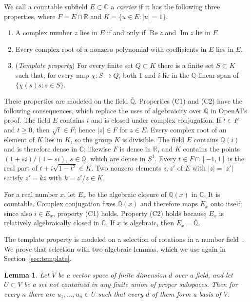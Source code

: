 \documentclass[10pt]{article}
\newtheorem{lem}[thm]{Lemma}
\theoremstyle{remark}
\newcommand{\C}{\mathbb C}
\newcommand{\R}{\mathbb R}
\newcommand{\Q}{\mathbb Q}
\newcommand{\Qbar}{\overline{\mathbb Q}}
\DeclareMathOperator{\re}{Re}
\DeclareMathOperator{\im}{Im}
\begin{document}
We call a countable subfield $E\subset\C$ a \emph{carrier} if it has the following three properties, where $F=E\cap\R$ and $K=\{u\in E:|u|=1\}$.
\begin{enumerate}
\item[(C1)] A complex number $z$ lies in $E$ if and only if $\re z$ and $\im z$ lie in $F$.
\item[(C2)] Every complex root of a nonzero polynomial with coefficients in $E$ lies in $E$.
\item[(C3)] (\emph{Template property}) For every finite set $Q\subset K$ there is a finite set $S\subset K$ such that, for every map $\chi\colon S\to Q$, both $1$ and $i$ lie in the $\Q$-linear span of $\{\chi(s)s:s\in S\}$.
\end{enumerate}

These properties are modeled on the field $\Qbar$. Properties (C1) and (C2) have the following consequences, which replace the uses of algebraicity over $\Q$ in OpenAI's proof. The field $E$ contains $i$ and is closed under complex conjugation. If $t\in F$ and $t\ge0$, then $\sqrt t\in F$; hence $|z|\in F$ for $z\in E$. Every complex root of an element of $K$ lies in $K$, so the group $K$ is divisible. The field $E$ contains $\Q(i)$ and is therefore dense in $\C$; likewise $F$ is dense in $\R$, and $K$ contains the points $(1+si)/(1-si)$, $s\in\Q$, which are dense in $S^1$. Every $t\in F\cap[-1,1]$ is the real part of $t+i\sqrt{1-t^2}\in K$. Two nonzero elements $z,z'$ of $E$ with $|z|=|z'|$ satisfy $z'=kz$ with $k=z'/z\in K$.

For a real number $x$, let $E_x$ be the algebraic closure of $\Q(x)$ in $\C$. It is countable. Complex conjugation fixes $\Q(x)$ and therefore maps $E_x$ onto itself; since also $i\in E_x$, property (C1) holds. Property (C2) holds because $E_x$ is relatively algebraically closed in $\C$. If $x$ is algebraic, then $E_x=\Qbar$.

The template property is modeled on a selection of rotations in a number field~\cite[Lemma~3.4]{OAI}. We prove that selection with two algebraic lemmas, which we use again in Section~\ref{sec:template}.

\begin{lem}\label{lem:generalposition}
Let $V$ be a vector space of finite dimension $d$ over a field, and let $U\subset V$ be a set not contained in any finite union of proper subspaces. Then for every $n$ there are $u_1,\ldots,u_n\in U$ such that every $d$ of them form a basis of $V$.
\end{lem}
\end{document}
